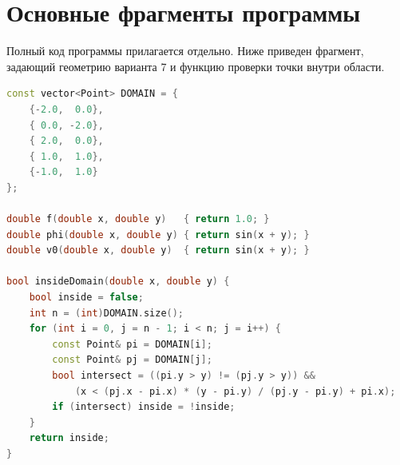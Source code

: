 \documentclass[12pt,a4paper]{article}
\begin{document}
\appendix
\section{Основные фрагменты программы}

Полный код программы прилагается отдельно. Ниже приведен фрагмент, задающий геометрию варианта 7 и функцию проверки точки внутри области.

\begin{lstlisting}[language=C++]
const vector<Point> DOMAIN = {
    {-2.0,  0.0},
    { 0.0, -2.0},
    { 2.0,  0.0},
    { 1.0,  1.0},
    {-1.0,  1.0}
};

double f(double x, double y)   { return 1.0; }
double phi(double x, double y) { return sin(x + y); }
double v0(double x, double y)  { return sin(x + y); }

bool insideDomain(double x, double y) {
    bool inside = false;
    int n = (int)DOMAIN.size();
    for (int i = 0, j = n - 1; i < n; j = i++) {
        const Point& pi = DOMAIN[i];
        const Point& pj = DOMAIN[j];
        bool intersect = ((pi.y > y) != (pj.y > y)) &&
            (x < (pj.x - pi.x) * (y - pi.y) / (pj.y - pi.y) + pi.x);
        if (intersect) inside = !inside;
    }
    return inside;
}
\end{lstlisting}
\end{document}
